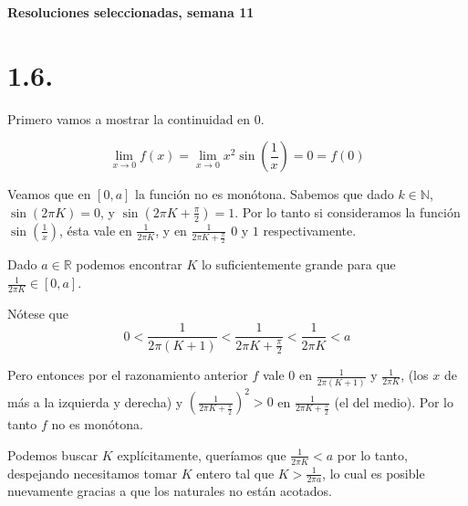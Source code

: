 \documentclass[10pt,a4paper]{article}
\begin{document}
\vspace{0,3cm}

\begin{center}
{\bf \Large Resoluciones seleccionadas, semana 11}
\end{center}


\vspace{0,3cm}

\section*{1.6.}\emph{}

\noindent
Primero vamos a mostrar la continuidad en $0$.


$$\displaystyle{\lim_{x\rightarrow 0} f(x)
  = \lim_{x\rightarrow 0} x^2 \sin \left(\frac{1}{x}\right)= 0 = f(0)}
$$


\noindent
Veamos que en $[0,a]$ la funci\'on no es mon\'otona.
Sabemos que dado $k \in \mathbb{N}$, $\sin(2\pi K)=0$, y
$\sin(2 \pi K + \frac{\pi}{2}) = 1$.
Por lo tanto si consideramos la funci\'on $\sin(\frac{1}{x})$, \'esta vale en
$\frac{1}{2\pi K}$, y en
$\frac{1}{2 \pi K + \frac{\pi}{2}}$ $0$ y $1$ respectivamente.

\noindent
Dado $a \in \mathbb{R}$ podemos encontrar $K$ lo suficientemente grande
para que $\frac{1}{2\pi K} \in [0,a]$.

\noindent
N\'otese que
$$0 < \frac{1}{2\pi (K+1)} <
\frac{1}{2 \pi K + \frac{\pi}{2}} < \frac{1}{2\pi K} < a$$

\noindent
Pero entonces por el razonamiento anterior
$f$ vale 0 en $\frac{1}{2\pi (K+1)}$ y $\frac{1}{2\pi K}$,
(los $x$ de m\'as a la izquierda y derecha) y
$(\frac{1}{2 \pi K + \frac{\pi}{2}})^2 > 0$ en
$\frac{1}{2 \pi K + \frac{\pi}{2}}$ (el del medio). Por lo tanto $f$
no es mon\'otona.

\noindent
Podemos buscar $K$ expl\'icitamente, quer\'iamos que $ \frac{1}{2\pi K}< a$
por lo tanto, despejando necesitamos tomar $K$ entero tal que
$ K >  \frac{1}{2\pi a}$, lo cual es posible nuevamente gracias a que
los naturales no est\'an acotados.
\end{document}
